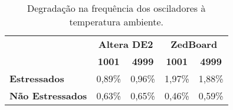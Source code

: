 \begin{table}[H]
\centering
\caption{Degradação na frequência dos osciladores à temperatura ambiente.}
\begin{tabular}{l|cr|cr|}
\cline{2-5}
 & \multicolumn{2}{c|}{\textbf{Altera DE2}} & \multicolumn{2}{c|}{\textbf{ZedBoard}} \\ \cline{2-5} 
 & \multicolumn{1}{c|}{\textbf{1001}} & \multicolumn{1}{c|}{\textbf{4999}} & \multicolumn{1}{c|}{\textbf{1001}} & \multicolumn{1}{c|}{\textbf{4999}} \\ \hline
\multicolumn{1}{|l|}{\textbf{Estressados}} & \multicolumn{1}{r|}{0,89\%} & 0,96\% & \multicolumn{1}{r|}{1,97\%} & 1,88\% \\ \hline
\multicolumn{1}{|l|}{\textbf{Não Estressados}} & \multicolumn{1}{r|}{0,63\%} & 0,65\% & \multicolumn{1}{r|}{0,46\%} & 0,59\% \\ \hline
\end{tabular}
\label{tab:DegradFinaisTAmb}
\end{table}